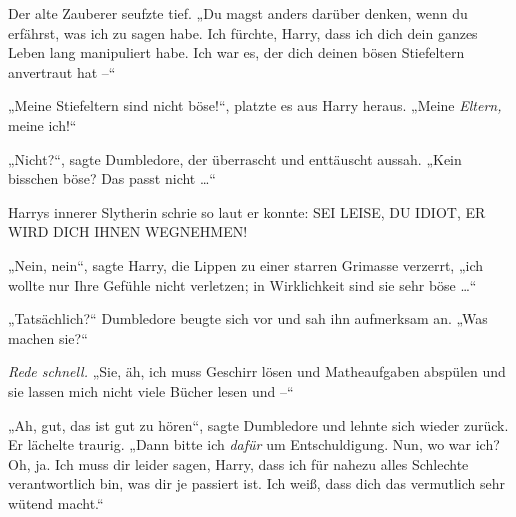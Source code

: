 Der alte Zauberer seufzte tief. „Du magst anders darüber denken, wenn du erfährst, was ich zu sagen habe. Ich fürchte, Harry, dass ich dich dein ganzes Leben lang manipuliert habe. Ich war es, der dich deinen bösen Stiefeltern anvertraut hat –“

„Meine Stiefeltern sind nicht böse!“, platzte es aus Harry heraus. „Meine \emph{Eltern,} meine ich!“

„Nicht?“, sagte Dumbledore, der überrascht und enttäuscht aussah. „Kein bisschen böse? Das passt nicht …“

Harrys innerer Slytherin schrie so laut er konnte: SEI LEISE, DU IDIOT, ER WIRD DICH IHNEN WEGNEHMEN!

„Nein, nein“, sagte Harry, die Lippen zu einer starren Grimasse verzerrt, „ich wollte nur Ihre Gefühle nicht verletzen; in Wirklichkeit sind sie sehr böse …“

„Tatsächlich?“ Dumbledore beugte sich vor und sah ihn aufmerksam an. „Was machen sie?“

\emph{Rede schnell.} „Sie, äh, ich muss Geschirr lösen und Matheaufgaben abspülen und sie lassen mich nicht viele Bücher lesen und –“

„Ah, gut, das ist gut zu hören“, sagte Dumbledore und lehnte sich wieder zurück. Er lächelte traurig. „Dann bitte ich \emph{dafür} um Entschuldigung. Nun, wo war ich? Oh, ja. Ich muss dir leider sagen, Harry, dass ich für nahezu alles Schlechte verantwortlich bin, was dir je passiert ist. Ich weiß, dass dich das vermutlich sehr wütend macht.“

